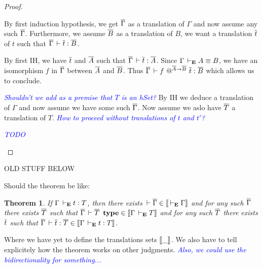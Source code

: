 \documentclass{amsart}
\newcommand\meta[1]{\noindent\textcolor{blue}{\emph{#1}}}
\newtheorem{theorem}{Theorem}[section]
\begin{document}
\begin{proof}
\begin{caselist}
    \nextcase
    \begin{mathc}
    \end{mathc}
    By first induction hypothesis, we get $\overline{\Gamma}$ as a translation of $\Gamma$
    and now assume any such $\overline{\Gamma}$. Furthermore, we assume $\overline{B}$ as a
    translation of $B$, we want a translation $\overline{t}$ of $t$ such that
    $\overline{\Gamma} \,\vdash \overline{t} : \overline{B}$.

    By first IH, we have $\overline{t}$ and $\overline{A}$ such that
    $\overline{\Gamma} \,\vdash \overline{t} : \overline{A}$. Since $\Gamma \,\vdash_\mathbf{E} A \equiv B$, we have
    an isomorphism $f$ in $\overline{\Gamma}$ between $\overline{A}$ and $\overline{B}$.
    Thus $\overline{\Gamma} \,\vdash f\ @^{\overline{A} \to \overline{B}}\ \overline{t} : \overline{B}$ which allows us
    to conclude.

    \nextcase
    \begin{mathc}
    \end{mathc}
    \meta{Shouldn't we add as a premise that $T$ is an hSet?}
    By IH we deduce a translation of $\Gamma$ and now assume we have some such
    $\overline{\Gamma}$. Now assume we aslo have $\overline{T}$ a translation of $T$.
    \meta{How to proceed without translations of $t$ and $t'$?}

    \nextcase
    \begin{mathc}
    \end{mathc}
    \meta{TODO}
  \end{caselist}
\end{proof}

\newpage
\hrulefill
OLD STUFF BELOW

Should the theorem be like:

\begin{theorem}
  If $\Gamma \,\vdash_\mathbf{E} t : T$, then there exists
  $\,\vdash \overline{\Gamma} \in \mathopen{{[\kern-0.14em[}} \,\vdash_\mathbf{E} \Gamma \mathclose{{]\kern-0.14em]}}$ and for any such $\overline{\Gamma}$ there exists
  $\overline{T}$ such that $\overline{\Gamma} \,\vdash \overline{T}\ \operatorname{\mathbf{type}} \in \mathopen{{[\kern-0.14em[}} \Gamma \,\vdash_\mathbf{E} T \mathclose{{]\kern-0.14em]}}$
  and for any such $\overline{T}$ there exists $\overline{t}$ such that
  $\overline{\Gamma} \,\vdash \overline{t} : \overline{T} \in \mathopen{{[\kern-0.14em[}} \Gamma \,\vdash_\mathbf{E} t : T \mathclose{{]\kern-0.14em]}}$.
\end{theorem}
%
Where we have yet to define the translations sets $\mathopen{{[\kern-0.14em[}} \_ \mathclose{{]\kern-0.14em]}}$.
We also have to tell explicitely how the theorem works on other judgments.
\meta{Also, we could use the bidirectionality for something...}
\end{document}
